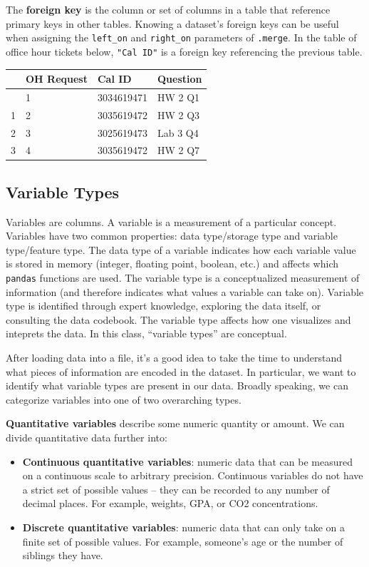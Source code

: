 \documentclass[
  letterpaper,
  DIV=11,
  numbers=noendperiod]{scrreprt}
\providecommand{\tightlist}{%
  \setlength{\itemsep}{0pt}\setlength{\parskip}{0pt}}\usepackage{longtable,booktabs,array}
\begin{document}
The \textbf{foreign key} is the column or set of columns in a table that
reference primary keys in other tables. Knowing a dataset's foreign keys
can be useful when assigning the \texttt{left\_on} and
\texttt{right\_on} parameters of \texttt{.merge}. In the table of office
hour tickets below, \texttt{"Cal\ ID"} is a foreign key referencing the
previous table.

\begin{longtable}[]{@{}llll@{}}
\toprule\noalign{}
& OH Request & Cal ID & Question \\
\midrule\noalign{}
\endhead
\bottomrule\noalign{}
\endlastfoot
0 & 1 & 3034619471 & HW 2 Q1 \\
1 & 2 & 3035619472 & HW 2 Q3 \\
2 & 3 & 3025619473 & Lab 3 Q4 \\
3 & 4 & 3035619472 & HW 2 Q7 \\
\end{longtable}

\subsection{Variable Types}\label{variable-types}

Variables are columns. A variable is a measurement of a particular
concept. Variables have two common properties: data type/storage type
and variable type/feature type. The data type of a variable indicates
how each variable value is stored in memory (integer, floating point,
boolean, etc.) and affects which \texttt{pandas} functions are used. The
variable type is a conceptualized measurement of information (and
therefore indicates what values a variable can take on). Variable type
is identified through expert knowledge, exploring the data itself, or
consulting the data codebook. The variable type affects how one
visualizes and inteprets the data. In this class, ``variable types'' are
conceptual.

After loading data into a file, it's a good idea to take the time to
understand what pieces of information are encoded in the dataset. In
particular, we want to identify what variable types are present in our
data. Broadly speaking, we can categorize variables into one of two
overarching types.

\textbf{Quantitative variables} describe some numeric quantity or
amount. We can divide quantitative data further into:

\begin{itemize}
\tightlist
\item
  \textbf{Continuous quantitative variables}: numeric data that can be
  measured on a continuous scale to arbitrary precision. Continuous
  variables do not have a strict set of possible values -- they can be
  recorded to any number of decimal places. For example, weights, GPA,
  or CO2 concentrations.
\item
  \textbf{Discrete quantitative variables}: numeric data that can only
  take on a finite set of possible values. For example, someone's age or
  the number of siblings they have.
\end{itemize}
\end{document}
